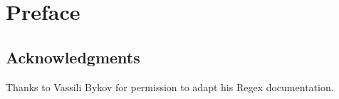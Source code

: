 \documentclass[a4paper,10pt,twoside]{book}
\begin{document}
	\sloppy
	\frontmatter
\fi
\chapter{Preface}


\section*{Acknowledgments}






Thanks to Vassili Bykov for permission to adapt his Regex documentation.

\ifx\wholebook\relax\else
   
   
\end{document}
